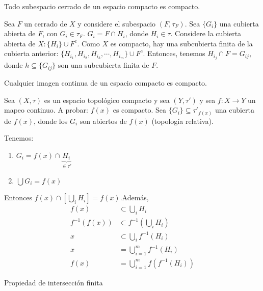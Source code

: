 \begin{teorema}
    Todo subespacio cerrado de un espacio compacto es compacto.
    \begin{dem}
        Sea $F$ un cerrado de $X$ y considere el subespacio $(F,\tau_F)$. Sea $\{G_i\}$ una cubierta abierta de $F$, con $G_i\in \tau_F$. $G_i=F\cap H_i$, donde $H_i\in\tau$. Considere la cubierta abierta de $X:\{H_i\}\cup F^c$. Como $X$ es compacto, hay una subcubierta finita de la cubierta anterior: $\{H_{i_1},H_{i_2},H_{i_3},\cdots, H_{i_m}\}\cup F^c $. Entonces, tenemos $H_{i_j}\cap F=G_{ij}$, donde $h\subseteq \{G_{ij}\}$ son una subcubierta finita de $F$. 
    \end{dem} 
\end{teorema}

\begin{teorema}
    Cualquier imagen continua de un espacio compacto es compacto. 
    \begin{dem}
        Sea $(X,\tau)$ es un espacio topológico compacto y sea $(Y,\tau')$ y sea $f:X\to Y$ un mapeo continuo. A probar: $f(x)$ es compacto. Sea $\{G_i\}\subseteq  \tau'_{f(x)}$ una cubierta de $f(x)$, donde los $G_i$ son abiertos de $f(x)$ (topología relativa).
        \begin{cajita}
            Tenemos: 
        \begin{enumerate}
            \item $G_i=f(x)\cap \underbrace{H_i}_{\in \tau'}$
            \item $\bigcup G_i =f(x)$
        \end{enumerate}
        Entonces $f(x)\cap [\bigcup_i H_i]=f(x)$.Además, 
        \begin{align*}
            f(x) &\subset \bigcup_i H_i\\
            f^{-1}(f(x))& \subset f^{-1}(\bigcup_i H_i)\\
            x &\subset \bigcup_i f^{-1}(H_i)\\
            x&= \bigcup_{i=1}^m f^{-1}(H_i)\\
            f(x) &= \bigcup_{i=1}^{m}f(f^{-1}(H_i ))
        \end{align*}
        \end{cajita}
        
    \end{dem}
\end{teorema}

\begin{prop}
    Propiedad de intersección finita 
\end{prop}

